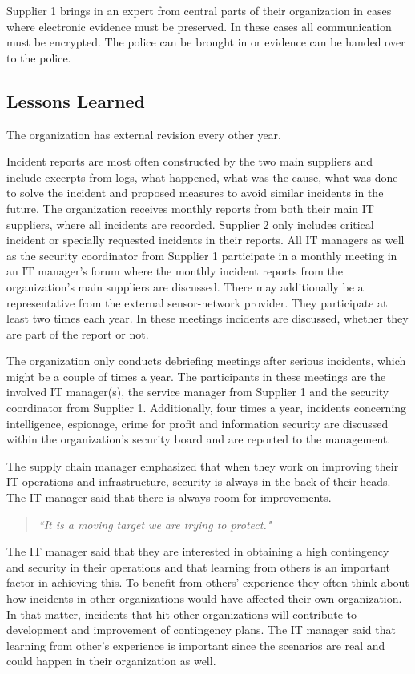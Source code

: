 Supplier 1 brings in an expert from central parts of their organization in cases where electronic evidence must be preserved. In these cases all communication must be encrypted. The police can be brought in or evidence can be handed over to the police.

\subsection{Lessons Learned}
The organization has external revision every other year.

Incident reports are most often constructed by the two main suppliers and include excerpts from logs, what happened, what was the cause, what was done to solve the incident and proposed measures to avoid similar incidents in the future. The organization receives monthly reports from both their main IT suppliers, where all incidents are recorded. Supplier 2 only includes critical incident or specially requested incidents in their reports. All IT managers as well as the security coordinator from Supplier 1 participate in a monthly meeting in an IT manager's forum where the monthly incident reports from the organization's main suppliers are discussed. There may additionally be a representative from the external sensor-network provider. They participate at least two times each year. In these meetings incidents are discussed, whether they are part of the report or not.

The organization only conducts debriefing meetings after serious incidents, which might be a couple of times a year. The participants in these meetings are the involved IT manager(s), the service manager from Supplier 1 and the security coordinator from Supplier 1. Additionally, four times a year, incidents concerning intelligence, espionage, crime for profit and information security are discussed within the organization's security board and are reported to the management. 

The supply chain manager emphasized that when they work on improving their IT operations and infrastructure, security is always in the back of their heads. The IT manager said that there is always room for improvements. 

\begin{quote}
\textit{``It is a moving target we are trying to protect."}
\end{quote}

The IT manager said that they are interested in obtaining a high contingency and security in their operations and that learning from others is an important factor in achieving this. To benefit from others' experience they often think about how incidents in other organizations would have affected their own organization. In that matter, incidents that hit other organizations will contribute to development and improvement of contingency plans. The IT manager said that learning from other's experience is important since the scenarios are real and could happen in their organization as well.

